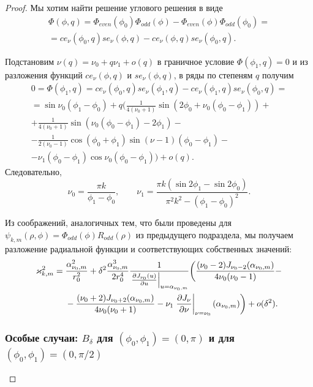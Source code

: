 \begin{proof}
Мы хотим найти решение углового решения в виде
\begin{multline*}
\Phi(\phi, q) = \Phi_{even}(\phi_0) \Phi_{odd}(\phi) - \Phi_{even}(\phi) \Phi_{odd}(\phi_0)  = \\
=ce_\nu(\phi_0, q) se_\nu(\phi, q) - ce_\nu(\phi, q) se_\nu(\phi_0, q).
\end{multline*}

 
Подстановим $\nu(q) = \nu_0 + q \nu_1 + o(q)$
в граничное условие  $\Phi(\phi_1, q) = 0$
и из разложения функций $ce_\nu(\phi, q)$ и $se_\nu(\phi, q)$, в ряды по степеням  $q$
 получим
\begin{multline*}
0=\Phi(\phi_1, q) = ce_\nu(\phi_0, q) se_\nu(\phi_1, q) -ce_\nu(\phi_1, q) se_\nu(\phi_0, q) = \\
= \sin \nu_0 (\phi_1 - \phi_0) +q \biggl(
\frac{1}{4(\nu_0+1)}  \sin{(2 \phi_0 + \nu_0(\phi_0-\phi_1))}+  \\
+\frac{1}{4(\nu_0+1)} \sin{(\nu_0(\phi_0-\phi_1)-2\phi_1)} - \\
-\frac{1}{2(\nu_0-1)}\cos{(\phi_0 + \phi_1)}\sin{(\nu-1)(\phi_0-\phi_1)} -\\
- \nu_1 (\phi_0 - \phi_1) \cos{\nu_0(\phi_0-\phi_1)} \biggr) + o(q).
\end{multline*}
Следовательно, 
\begin{equation*}
    \nu_0 = \frac{\pi k}{\phi_1-\phi_0}, \qquad \nu_1 = \frac{\pi k (\sin 2\phi_1 - \sin 2 \phi_0)}{\pi^2k^2-(\phi_1-\phi_0)^2}.
\end{equation*}

Из соображений, аналогичных тем, что были проведены для  $\psi_{k, m}(\rho, \phi) = \Phi_{odd}(\phi) R_{odd}(\rho)$ из предыдущего подраздела,
мы получаем разложение радиальной функции и соответствующих собственных значений:
\begin{align*}
    \varkappa_{k, m}^2 ={}& \frac{\alpha_{\nu_0, m}^2}{r_0^2} +  \delta^2 \frac{\alpha_{\nu_0, m}^3}{2 r_0^4}\frac{1}{ \left.\frac{\partial J_{\nu_0}(u)}{\partial u}\right|_{u=\alpha_{\nu_0, m}} }\biggl(\frac{(\nu_0 - 2)J_{\nu_0-2}(\alpha_{\nu_0, m})   }{4\nu_0 (\nu_0-1)} - \notag \\
&{}- \frac{(\nu_0 + 2)J_{\nu_0+2}(\alpha_{\nu_0, m})}{4\nu_0 (\nu_0+1)}  - \nu_1 \left.\frac{\partial J_\nu}{\partial \nu}\right|_{\nu = \nu_0}(\alpha_{\nu_0, m})
    \biggr) + o(\delta^2).
\end{align*}

\subsubsection{Особые случаи: $B_\delta$ для $(\phi_0, \phi_1)=(0,\pi)$ и для $(\phi_0, \phi_1)=(0,\pi/2)$}\label{sec:ch2/sec2/sub2/sub2}



\end{proof}
